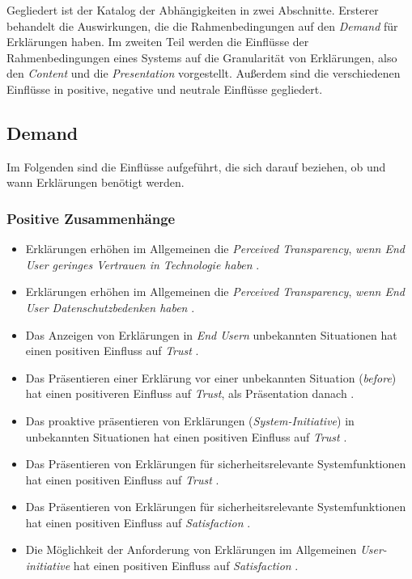 Gegliedert ist der Katalog der Abhängigkeiten in zwei Abschnitte. Ersterer behandelt die Auswirkungen, die die Rahmenbedingungen auf den \textit{Demand} für Erklärungen haben. Im zweiten Teil werden die Einflüsse der Rahmenbedingungen eines Systems auf die Granularität von Erklärungen, also den \textit{Content} und die \textit{Presentation} vorgestellt. Außerdem sind die verschiedenen Einflüsse in positive, negative und neutrale Einflüsse gegliedert.

\newpage

\subsection*{Demand}

Im Folgenden sind die Einflüsse aufgeführt, die sich darauf beziehen, ob und wann Erklärungen benötigt werden.

\subsubsection*{Positive Zusammenhänge}

\begin{itemize}
    \item Erklärungen erhöhen im Allgemeinen die \textit{Perceived Transparency}, \textit{wenn End User geringes Vertrauen in Technologie haben} \cite{tsai_effects_2020}. 
    \item Erklärungen erhöhen im Allgemeinen die \textit{Perceived Transparency}, \textit{wenn End User Datenschutzbedenken haben} \cite{tsai_effects_2020}.
    \item Das Anzeigen von Erklärungen in \textit{End Usern} unbekannten Situationen hat einen positiven Einfluss auf \textit{Trust} \cite{haspiel_explanations_2018}.
    \item Das Präsentieren einer Erklärung vor einer unbekannten Situation (\textit{before}) hat einen positiveren Einfluss auf \textit{Trust}, als Präsentation danach \cite{haspiel_explanations_2018}.
    \item Das proaktive präsentieren von Erklärungen (\textit{System-Initiative}) in unbekannten Situationen hat einen positiven Einfluss auf \textit{Trust} \cite{zhu_effects_2020}.
    \item Das Präsentieren von Erklärungen für sicherheitsrelevante Systemfunktionen hat einen positiven Einfluss auf \textit{Trust}  \cite{wiegand2019drive}.
    \item Das Präsentieren von Erklärungen für sicherheitsrelevante Systemfunktionen hat einen positiven Einfluss auf \textit{Satisfaction}  \cite{wiegand2019drive}.
    \item Die Möglichkeit der Anforderung von Erklärungen im Allgemeinen \textit{User-initiative} hat einen positiven Einfluss auf \textit{Satisfaction} \cite{chazette_end-users_nodate}.
\end{itemize}

